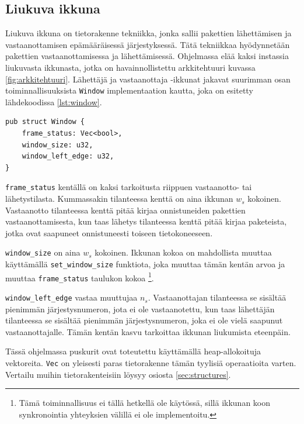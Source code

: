 \documentclass[a4paper,12pt]{article}
\begin{document}
\newpage


    \subsection{Liukuva ikkuna}\label{sec:liukuva_ikkuna}
    \slidingWindow
    Liukuva ikkuna on tietorakenne tekniikka, jonka sallii pakettien lähettämisen ja vastaanottamisen epämääräisessä järjestyksessä. 
    Tätä tekniikkaa hyödynnetään pakettien vastaanottamisessa ja lähettämisessä. Ohjelmassa elää kaksi instassia liukuvasta ikkunasta, jotka on havainnollistettu arkkitehtuuri kuvassa \ref{fig:arkkitehtuuri}. Lähettäjä ja vastaanottaja -ikkunat jakavat suurimman osan toiminnallisuuksista \lstinline{Window} implementaation kautta, joka on esitetty lähdekoodissa \ref{lst:window}. 

\newpage
    
\begin{lstlisting}[caption={Ikkunan rakenne}, label={lst:window}]
pub struct Window {
    frame_status: Vec<bool>,
    window_size: u32,
    window_left_edge: u32,
}\end{lstlisting}

\lstinline{frame_status} kentällä on kaksi tarkoitusta riippuen vastaanotto- tai lähetystilasta. Kummassakin tilanteessa kenttä on aina ikkunan $w_s$ kokoinen. Vastaanotto tilanteessa kenttä pitää kirjaa onnistuneiden pakettien vastaanottamisesta, kun taas lähetys tilanteessa kenttä pitää kirjaa paketeista, jotka ovat saapuneet onnistuneesti toiseen tietokoneeseen. \par

\lstinline{window_size} on aina $w_s$ kokoinen. Ikkunan kokoa on mahdollista muuttaa käyttämällä \lstinline{set_window_size} funktiota, joka muuttaa tämän kentän arvoa ja muuttaa \lstinline{frame_status} taulukon kokoa \footnote{Tämä toiminnallisuus ei tällä hetkellä ole käytössä, sillä ikkunan koon synkronointia yhteyksien välillä ei ole implementoitu.}.\par

\lstinline{window_left_edge} vastaa muuttujaa $n_s$. Vastaanottajan tilanteessa se sisältää pienimmän järjestysnumeron, jota ei ole vastaanotettu, kun taas lähettäjän tilanteessa se sisältää pienimmän järjestysnumeron, joka ei ole vielä saapunut vastaanottajalle. Tämän kentän kasvu tarkoittaa ikkunan liukumista eteenpäin. 

    Tässä ohjelmassa puskurit ovat toteutettu käyttämällä heap-allokoituja vektoreita. \lstinline{Vec} on yleisesti paras tietorakenne tämän tyylisiä operaatioita varten. Vertailu muihin tietorakenteisiin löysyy osiosta \ref{sec:structures}.
\end{document}

